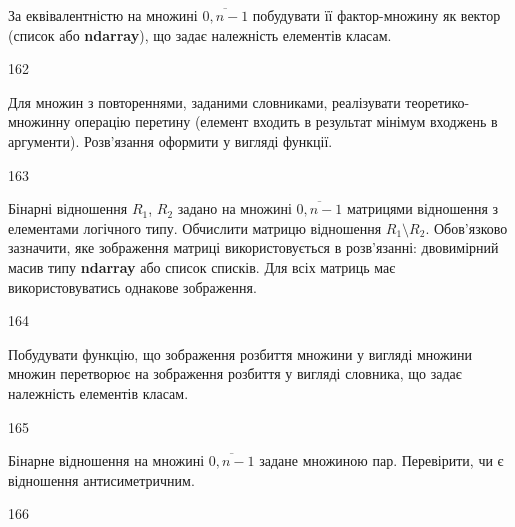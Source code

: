 За еквівалентністю на множині $\overline{0,n-1}$ побудувати її фактор-множину як вектор (список або  \textbf{ndarray}), що задає належність елементів класам.
\\\par
162 














Для множин з повтореннями, заданими словниками, реалізувати теоретико-множинну операцію перетину (елемент входить в результат мінімум входжень в аргументи). Розв’язання оформити у вигляді функції.
\\\par
163 














Бінарні відношення $R_1$, $R_2$ задано на множині $\overline{0,n-1}$ матрицями відношення з елементами логічного типу. Обчислити матрицю відношення $R_1\setminus R_2$. Обов'язково зазначити, яке зображення матриці використовується в розв'язанні: двовимірний масив типу \textbf{ndarray} або список списків. Для всіх матриць має використовуватись однакове зображення.
\\\par
164 














Побудувати функцію, що зображення розбиття множини у вигляді множини множин перетворює на зображення розбиття у вигляді словника, що задає належність елементів класам.
\\\par
165 














Бінарне відношення на множині $\overline{0,n-1}$ задане множиною пар. Перевірити, чи є відношення антисиметричним.
\\\par
166 














